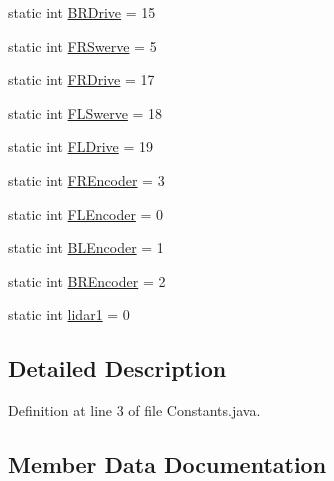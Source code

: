 \begin{DoxyCompactItemize}
\item 
static int \mbox{\hyperlink{classorg_1_1usfirst_1_1frc3707_1_1_creedence_1_1_p_i_d_ints_1_1_constants_adb9469ceeb335555e73f6212a33539b7}{B\+R\+Drive}} = 15
\item 
static int \mbox{\hyperlink{classorg_1_1usfirst_1_1frc3707_1_1_creedence_1_1_p_i_d_ints_1_1_constants_a45ba281100d4b822ee2acda83bf15e96}{F\+R\+Swerve}} = 5
\item 
static int \mbox{\hyperlink{classorg_1_1usfirst_1_1frc3707_1_1_creedence_1_1_p_i_d_ints_1_1_constants_af010deccc9914262bb634219e5b52064}{F\+R\+Drive}} = 17
\item 
static int \mbox{\hyperlink{classorg_1_1usfirst_1_1frc3707_1_1_creedence_1_1_p_i_d_ints_1_1_constants_a6126ce57802df5083a9ba56726cb3772}{F\+L\+Swerve}} = 18
\item 
static int \mbox{\hyperlink{classorg_1_1usfirst_1_1frc3707_1_1_creedence_1_1_p_i_d_ints_1_1_constants_a44d3686028265a39e7007ea36db932eb}{F\+L\+Drive}} = 19
\item 
static int \mbox{\hyperlink{classorg_1_1usfirst_1_1frc3707_1_1_creedence_1_1_p_i_d_ints_1_1_constants_accb1a6383a9afebe7f1d395113bef025}{F\+R\+Encoder}} = 3
\item 
static int \mbox{\hyperlink{classorg_1_1usfirst_1_1frc3707_1_1_creedence_1_1_p_i_d_ints_1_1_constants_a18e12e51a382a5327548a8401ce3feb9}{F\+L\+Encoder}} = 0
\item 
static int \mbox{\hyperlink{classorg_1_1usfirst_1_1frc3707_1_1_creedence_1_1_p_i_d_ints_1_1_constants_ad8174e87accdca1aa5713d3ae66bbf8e}{B\+L\+Encoder}} = 1
\item 
static int \mbox{\hyperlink{classorg_1_1usfirst_1_1frc3707_1_1_creedence_1_1_p_i_d_ints_1_1_constants_ad5fa32a3b35c952321eb05afc03505c7}{B\+R\+Encoder}} = 2
\item 
static int \mbox{\hyperlink{classorg_1_1usfirst_1_1frc3707_1_1_creedence_1_1_p_i_d_ints_1_1_constants_aea549567cdd9492736429691316d0c18}{lidar1}} = 0
\end{DoxyCompactItemize}


\subsection{Detailed Description}


Definition at line 3 of file Constants.\+java.



\subsection{Member Data Documentation}
\mbox{\label{classorg_1_1usfirst_1_1frc3707_1_1_creedence_1_1_p_i_d_ints_1_1_constants_a87bc8749571a703f75883bcd0c9639e5}} 
